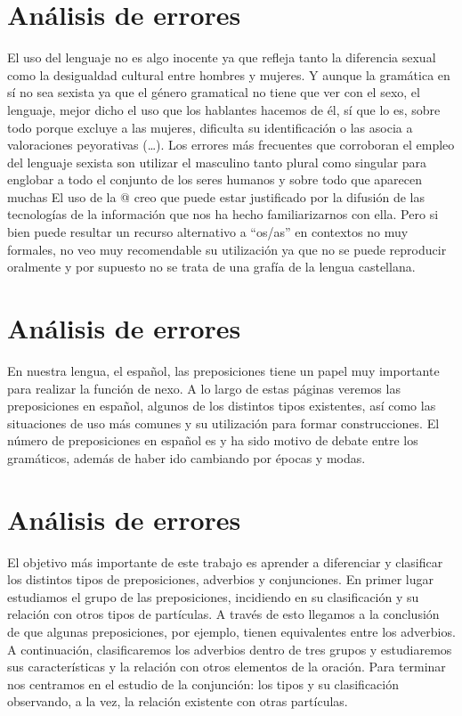 \documentclass[12pt, a4paper, oneside]{report}
\begin{document}
\section{Análisis de errores}
El uso del lenguaje no es algo inocente %
ya que reﬂeja tanto la diferencia sexual como la desigualdad %
cultural entre hombres y mujeres.
Y aunque la gramática en sí no sea sexista %
ya que el género gramatical no tiene que ver con %
el sexo, el lenguaje, mejor dicho el uso que los hablantes hacemos de él, sí que lo es, sobre
todo porque excluye a las mujeres, diﬁculta su identiﬁcación o las asocia a valoraciones
peyorativas (…).
Los errores más frecuentes que corroboran el
empleo del lenguaje sexista son utilizar el
masculino tanto plural como singular para
englobar a todo el conjunto de los seres
humanos y sobre todo que aparecen muchas
El uso de la @ creo que puede estar
justiﬁcado por la difusión de las tecnologías
de la información que nos ha hecho
familiarizarnos con ella. Pero si bien puede
resultar un recurso alternativo a “os/as” en
contextos no muy formales, no veo muy
recomendable su utilización ya que no se
puede reproducir oralmente y por
supuesto no se trata de una grafía de la
lengua castellana.

\section{Análisis de errores}

En nuestra lengua, el español, %
las preposiciones tiene %
 un papel muy importante para realizar la función de nexo.
A lo largo de estas páginas veremos %
 las preposiciones en español, %
 algunos de los distintos tipos existentes, así como las
situaciones de uso más comunes y su
utilización para formar construcciones. %
 El
número de preposiciones en español es y
ha sido motivo de debate entre los
gramáticos,
además
de
haber
ido cambiando por épocas y modas.

\section{Análisis de errores}
El objetivo más importante de este trabajo es
aprender a diferenciar y clasiﬁcar los distintos tipos
de preposiciones, adverbios y conjunciones.
En primer lugar %
estudiamos el grupo de las preposiciones, incidiendo en su clasiﬁcación y su
relación con otros tipos de partículas. A través de
esto llegamos a la conclusión de que algunas
preposiciones, por ejemplo, tienen equivalentes
entre los adverbios.
A continuación, clasiﬁcaremos los adverbios
dentro de tres grupos y estudiaremos sus
características y la relación con otros elementos de
la oración.
Para terminar nos centramos en el estudio de la
conjunción: los tipos y su clasiﬁcación observando,
a la vez, la relación existente con otras partículas.
\end{document}
